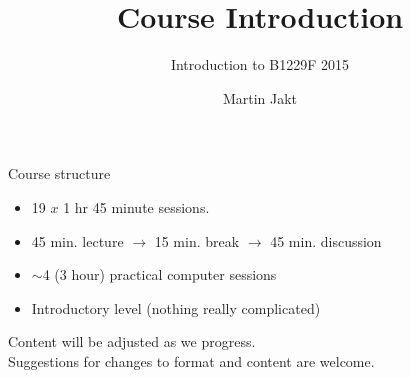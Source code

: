 \documentclass[pdf]{beamer}
\title{Course Introduction}
\subtitle{Introduction to B1229F 2015}
\author{Martin Jakt}
\begin{document}
\begin{frame}
  \titlepage
\end{frame}

\begin{frame}{Course structure}
  \begin{itemize}
    \item 19 $x$ 1 hr 45 minute sessions.
    \pause
    \item 45 min. lecture $\rightarrow$ 15 min. break $\rightarrow$ 45 min. discussion
    \pause
    \item $\sim$4 (3 hour) practical computer sessions
    \pause
    \item Introductory level (nothing really complicated)
  \end{itemize}
  \pause
  Content will be adjusted as we progress.\\
  Suggestions for changes to format and content are welcome.
\end{frame}
\end{document}
